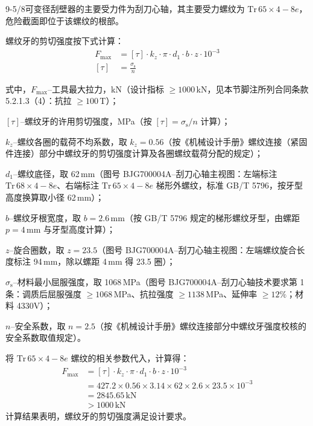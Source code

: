 9-5/8\inch 可变径刮壁器的主要受力件为刮刀心轴，其主要受力螺纹为 $\mathrm{Tr}\,65 \times 4-8e$，危险截面即位于该螺纹的根部。

螺纹牙的剪切强度按下式计算：
\begin{equation}
	\begin{aligned}
	    F_{\max} &= [\tau] \cdot k_z \cdot \pi \cdot d_1 \cdot b \cdot z \cdot 10^{-3} \\
	    [\tau] &= \frac{\sigma_{\mathrm{s}}}{n}
	\end{aligned}
	\end{equation}
	
式中，$F_{\max}$--工具最大拉力，kN（设计指标 $\ge 1000$\,kN，见本节脚注所列合同条款 5.2.1.3（4）：抗拉 $\ge 100$\,T）；

$[\tau]$--螺纹牙的许用剪切强度，MPa（按 $[\tau]=\sigma_{\mathrm{s}}/n$ 计算）；

$k_z$--螺纹各圈的载荷不均系数，取 $k_z = 0.56$（按《机械设计手册》螺纹连接（紧固件连接）部分中螺纹牙的剪切强度计算及各圈螺纹载荷分配的规定\cite{ref26}）；

$d_1$--螺纹底径，取 62\,mm（图号 BJG700004A--刮刀心轴主视图：左端标注 $\mathrm{Tr}\,68\times4-8e$、右端标注 $\mathrm{Tr}\,65\times4-8e$ 梯形外螺纹，标准 GB/T 5796，按牙型高度换算取小径 62\,mm）；

$b$--螺纹牙根宽度，取 $b = 2.6\,\text{mm}$（按 GB/T 5796 规定的梯形螺纹牙型，由螺距 $p=4\,\text{mm}$ 与牙型高度计算）；

$z$--旋合圈数，取 $z = 23.5$（图号 BJG700004A--刮刀心轴主视图：左端螺纹旋合长度标注 94\,mm，除以螺距 4\,mm 得 23.5 圈）；

$\sigma_{\mathrm{s}}$--材料最小屈服强度，取 1068\,MPa（图号 BJG700004A--刮刀心轴技术要求第 1 条：调质后屈服强度 $\ge 1068$\,MPa、抗拉强度 $\ge 1138$\,MPa、延伸率 $\ge 12\%$；材料 4330V）；

$n$--安全系数，取 $n = 2.5$（按《机械设计手册》螺纹连接部分中螺纹牙强度校核的安全系数取值规定\cite{ref26}）。

将 $\mathrm{Tr}\,65 \times 4-8e$ 螺纹的相关参数代入，计算得：
\begin{equation}
    \begin{aligned}
    F_{\max} &= [\tau] \cdot k_z \cdot \pi \cdot d_1 \cdot b \cdot z \cdot 10^{-3} \\
             &= 427.2 \times 0.56 \times 3.14 \times 62 \times 2.6 \times 23.5 \times 10^{-3} \\
             &= 2845.65\,\mathrm{kN} \\
             &> 1000\,\mathrm{kN}
    \end{aligned}
\end{equation}
计算结果表明，螺纹牙的剪切强度满足设计要求。



